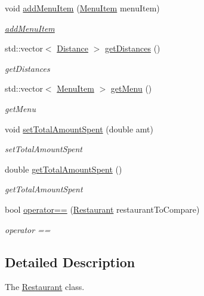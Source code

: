 \begin{DoxyCompactItemize}
void \hyperlink{class_restaurant_a5e743b42c3d5277a5c30728e5a6010f0}{add\+Menu\+Item} (\hyperlink{class_menu_item}{Menu\+Item} menu\+Item)
\begin{DoxyCompactList}\small\item\em \hyperlink{classadd_menu_item}{add\+Menu\+Item} \end{DoxyCompactList}\item 
std\+::vector$<$ \hyperlink{class_distance}{Distance} $>$ \hyperlink{class_restaurant_a4b76f9f7171cb961e33bb670c22e91f0}{get\+Distances} ()
\begin{DoxyCompactList}\small\item\em get\+Distances \end{DoxyCompactList}\item 
std\+::vector$<$ \hyperlink{class_menu_item}{Menu\+Item} $>$ \hyperlink{class_restaurant_a67da76f6ae80d9c22c8c697ebbb8a684}{get\+Menu} ()
\begin{DoxyCompactList}\small\item\em get\+Menu \end{DoxyCompactList}\item 
void \hyperlink{class_restaurant_a084b4300b60a5d76cbdcbe01724ba5a6}{set\+Total\+Amount\+Spent} (double amt)
\begin{DoxyCompactList}\small\item\em set\+Total\+Amount\+Spent \end{DoxyCompactList}\item 
double \hyperlink{class_restaurant_a983d7e6327f4f88d9d5aefe4d6beb7c0}{get\+Total\+Amount\+Spent} ()
\begin{DoxyCompactList}\small\item\em get\+Total\+Amount\+Spent \end{DoxyCompactList}\item 
bool \hyperlink{class_restaurant_ac8b5a5436f9e3952f64abc32dc02a82b}{operator==} (\hyperlink{class_restaurant}{Restaurant} restaurant\+To\+Compare)
\begin{DoxyCompactList}\small\item\em operator == \end{DoxyCompactList}\end{DoxyCompactItemize}


\subsection{Detailed Description}
The \hyperlink{class_restaurant}{Restaurant} class. 

